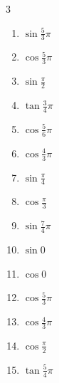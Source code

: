 \begin{multicols}{3}
\begin{enumerate}
\columnbreak %

\resetques

  \item $\displaystyle \sin{\frac{5}{3}\pi}$

  \item $\displaystyle \cos{\frac{5}{3}\pi}$

  \item $\displaystyle \sin{\frac{\pi}{2}}$
        \phantom{$\displaystyle =1$}

  \item $\displaystyle \tan{\frac{3}{4}\pi}$
        \phantom{$\displaystyle =-1$}

  \item $\displaystyle \cos{\frac{5}{6}\pi}$

  \item $\displaystyle \cos{\frac{4}{3}\pi}$

  \item $\displaystyle \sin{\frac{\pi}{4}}$

  \item $\displaystyle \cos{\frac{\pi}{3}}$

  \item $\displaystyle \sin{\frac{7}{4}\pi}$

  \item $\displaystyle \sin{0}$
        \phantom{$\displaystyle =0$}

  \item $\displaystyle \cos{0}$
        \phantom{$\displaystyle =1$}

  \item $\displaystyle \cos{\frac{5}{3}\pi}$

  \item $\displaystyle \cos{\frac{4}{3}\pi}$

  \item $\displaystyle \cos{\frac{\pi}{2}}$
        \phantom{$\displaystyle =0$}

  \item $\displaystyle \tan{\frac{5}{4}\pi}$
        \phantom{$\displaystyle =1$}


\end{enumerate}
\end{multicols}
